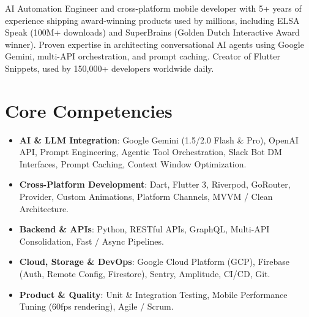 \documentclass[11pt,a4paper,sans]{moderncv}
\begin{document}
\makecvtitle


\vspace{4pt}
\small{AI Automation Engineer and cross-platform mobile developer with 5+ years of experience shipping award-winning products used by millions, including ELSA Speak (100M+ downloads) and SuperBrains (Golden Dutch Interactive Award winner). Proven expertise in architecting conversational AI agents using Google Gemini, multi-API orchestration, and prompt caching. Creator of Flutter Snippets, used by 150,000+ developers worldwide daily.}


\section{Core Competencies}
\vspace{1pt}
\begin{itemize}

\item \textbf{AI \& LLM Integration}: Google Gemini (1.5/2.0 Flash \& Pro), OpenAI API, Prompt Engineering, Agentic Tool Orchestration, Slack Bot DM Interfaces, Prompt Caching, Context Window Optimization.

\item \textbf{Cross-Platform Development}: Dart, Flutter 3, Riverpod, GoRouter, Provider, Custom Animations, Platform Channels, MVVM / Clean Architecture.

\item \textbf{Backend \& APIs}: Python, RESTful APIs, GraphQL, Multi-API Consolidation, Fast / Async Pipelines.

\item \textbf{Cloud, Storage \& DevOps}: Google Cloud Platform (GCP), Firebase (Auth, Remote Config, Firestore), Sentry, Amplitude, CI/CD, Git.

\item \textbf{Product \& Quality}: Unit \& Integration Testing, Mobile Performance Tuning (60fps rendering), Agile / Scrum.

\end{itemize}

\end{document}
